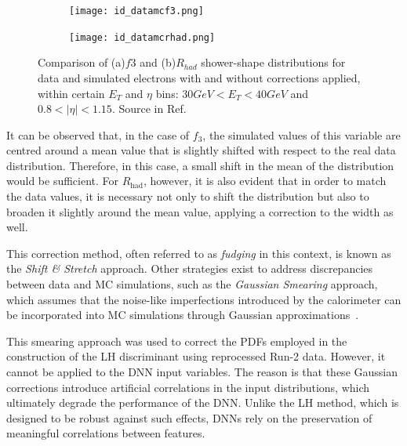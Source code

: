 \begin{figure}[htbp]
  \centering
  \begin{subfigure}[b]{0.45\textwidth}
      \texttt{[image: id\_datamcf3.png]}
      \caption{}
  \end{subfigure}
  \hfill
  \begin{subfigure}[b]{0.45\textwidth}
      \texttt{[image: id\_datamcrhad.png]}
      \caption{}
  \end{subfigure}
  \hfill
  \caption{Comparison of (a)$f3$ and (b)$R_{had}$ shower-shape distributions for data and simulated electrons with and without corrections applied, within certain $E_{T}$ and $\eta$ bins: $30 GeV < E_{T} < 40 GeV$ and $0.8<|\eta|<1.15$. Source in Ref.~\cite{Aaboud:2657964}}
  \label{fig:corrected}
\end{figure}

It can be observed that, in the case of $f_3$, the simulated values of this variable are centred around a mean value that is slightly shifted with respect to the real data distribution. Therefore, in this case, a small shift in the mean of the distribution would be sufficient. 
For $R_{\text{had}}$, however, it is also evident that in order to match the data values, it is necessary not only to shift the distribution but also to broaden it slightly around the mean value, applying a correction to the width as well.

This correction method, often referred to as \textit{fudging} in this context, is known as the \textit{Shift \& Stretch} approach. Other strategies exist to address discrepancies between data and MC simulations, such as the \textit{Gaussian Smearing} approach, which assumes that the noise-like imperfections introduced by the calorimeter can be incorporated into MC simulations through Gaussian approximations~\cite{Puddefoot:2797826}.

This smearing approach was used to correct the PDFs employed in the construction of the LH discriminant using reprocessed Run-2 data. However, it cannot be applied to the DNN input variables. The reason is that these Gaussian corrections introduce artificial correlations in the input distributions, which ultimately degrade the performance of the DNN. Unlike the LH method, which is designed to be robust against such effects, DNNs rely on the preservation of meaningful correlations between features.

